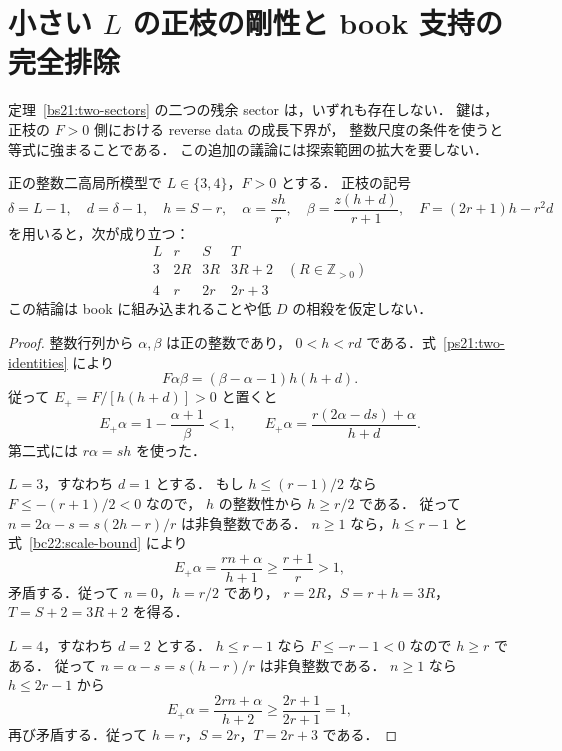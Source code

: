 \section{小さい \texorpdfstring{$L$}{L} の正枝の剛性と book 支持の完全排除}
\label{bc22:section}

定理~\ref{bs21:two-sectors} の二つの残余 sector は，いずれも存在しない．
鍵は，正枝の $F>0$ 側における reverse data の成長下界が，
整数尺度の条件を使うと等式に強まることである．
この追加の議論には探索範囲の拡大を要しない．

\begin{lemma}
\label{bc22:positive-rigidity}
正の整数二高局所模型で $L\in\{3,4\}$，$F>0$ とする．
正枝の記号
\[
 \delta=L-1,\quad d=\delta-1,\quad h=S-r,\quad
 \alpha=\frac{sh}{r},\quad \beta=\frac{z(h+d)}{r+1},\quad
 F=(2r+1)h-r^2d
\]
を用いると，次が成り立つ：
\begin{equation}\label{bc22:rigidity}
 \begin{array}{c|ccc}
 L & r&S&T\\\hline
 3&2R&3R&3R+2\quad(R\in\mathbb Z_{>0})\\
 4&r&2r&2r+3
 \end{array}
\end{equation}
この結論は book に組み込まれることや低 $D$ の相殺を仮定しない．
\end{lemma}

\begin{proof}
整数行列から $\alpha,\beta$ は正の整数であり，
$0<h<rd$ である．式~\eqref{ps21:two-identities} により
\[
 F\alpha\beta=(\beta-\alpha-1)h(h+d).
\]
従って $E_+=F/[h(h+d)]>0$ と置くと
\begin{equation}\label{bc22:scale-bound}
 E_+\alpha=1-\frac{\alpha+1}{\beta}<1,
 \qquad
 E_+\alpha=\frac{r(2\alpha-ds)+\alpha}{h+d}.
\end{equation}
第二式には $r\alpha=sh$ を使った．

$L=3$，すなわち $d=1$ とする．
もし $h\le(r-1)/2$ なら $F\le-(r+1)/2<0$ なので，
$h$ の整数性から $h\ge r/2$ である．
従って $n=2\alpha-s=s(2h-r)/r$ は非負整数である．
$n\ge1$ なら，$h\le r-1$ と式~\eqref{bc22:scale-bound} により
\[
 E_+\alpha=\frac{rn+\alpha}{h+1}
 \ge\frac{r+1}{r}>1,
\]
矛盾する．従って $n=0$，$h=r/2$ であり，
$r=2R$，$S=r+h=3R$，$T=S+2=3R+2$ を得る．

$L=4$，すなわち $d=2$ とする．
$h\le r-1$ なら $F\le-r-1<0$ なので $h\ge r$ である．
従って $n=\alpha-s=s(h-r)/r$ は非負整数である．
$n\ge1$ なら $h\le2r-1$ から
\[
 E_+\alpha=\frac{2rn+\alpha}{h+2}
 \ge\frac{2r+1}{2r+1}=1,
\]
再び矛盾する．従って $h=r$，$S=2r$，$T=2r+3$ である．
\end{proof}

